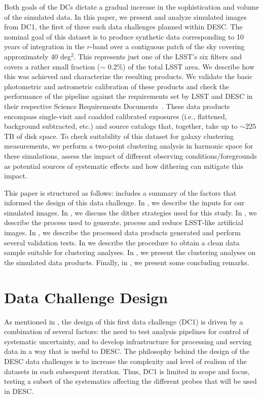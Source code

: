 \documentclass[twocolumn]{aastex62}
\begin{document}
Both goals of the DCs dictate a gradual increase in the
sophistication and volume of the simulated data. In this paper, we
present and analyze simulated images from DC1, the first of three such
data challenges planned within DESC. The nominal goal of this dataset
is to produce synthetic data corresponding to 10 years of integration
in the $r$-band over a contiguous patch of the sky covering approximately 40 deg$^{2}$. This represents just one of the LSST's six filters and covers a rather 
small fraction ($\sim$ 0.2\%) of the total LSST area. We
describe how this was achieved and characterize the resulting
products. We validate the basic photometric and astrometric
calibration of these products and check the performance of the
pipeline against the requirements set by LSST and DESC in their
respective Science Requirements Documents~\citep{LPM-17,
  2018arXiv180901669T}. These data products encompass single-visit and
coadded calibrated exposures (i.e., flattened, background subtracted,
etc.) and source catalogs that, together, take up to $\sim 225$ TB of disk
space. To check suitability of this dataset for galaxy clustering
measurements, we perform a two-point clustering analysis in harmonic space for these simulations, assess the impact of different observing conditions/foregrounds as potential sources of systematic effects and how dithering can mitigate this impact. 

This paper is structured as follows:  includes a summary of the factors that informed
the design of this data challenge.  In , we describe the inputs for our simulated images. In , we discuss the dither strategies used for this study. In , we describe the process used to generate, process and reduce LSST-like artificial images. In , we describe the processed data products generated and perform several validation tests. In  we describe the procedure to obtain a clean data sample suitable for clustering analyses. In , we present the clustering analyses on the simulated data products. Finally, in , we present some concluding remarks.

\section{Data Challenge Design}
\label{sec:design}

As mentioned in , the design of this first data challenge (DC1) is driven by a
combination of several factors: the need to test analysis pipelines for control of systematic
uncertainty, and to develop infrastructure for processing and serving data in a way that is useful
to DESC. The philosophy behind the design of the DESC data challenges is to increase the complexity and level
of realism of the datasets in each subsequent iteration. Thus, DC1 is limited in scope and focus, testing a subset of the systematics affecting the different probes that will be used in DESC.
\end{document}
